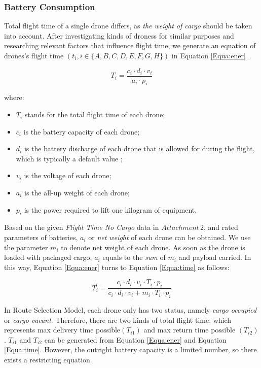 \documentclass{mcmthesis}
\begin{document}
\subsubsection{Battery Consumption}\label{Subsub:batt}

Total flight time of a single drone differs, as \emph{the weight of cargo} should be taken into account. After investigating kinds of droness for similar purposes and researching relevant factors that influence flight time, we generate an equation of drones's flight time $(t_i,i\in\{A,B,C,D,E,F,G,H\})$ in Equation \eqref{Equa:ener}~\cite{DroneFlightTime}.

\begin{equation}\label{Equa:ener}
    T_i = \frac{c_i \cdot d_i \cdot v_i}{a_i \cdot p_i}
\end{equation}

where:
\begin{itemize}
\item $T_i$ stands for the total flight time of each drone;
\item $c_i$ is the battery capacity of each drone;
\item $d_i$ is the battery discharge of each drone that is allowed for during the flight, which is typically a default value ;
\item $v_i$ is the voltage of each drone;
\item $a_i$ is the all-up weight of each drone;
\item $p_i$ is the power required to lift one kilogram of equipment.
\end{itemize}

Based on the given \emph{Flight Time No Cargo} data in $Attachment\,2$, and rated parameters of batteries, $a_i$ or \emph{net weight} of each drone can be obtained. We use the parameter $m_i$ to denote net weight of each drone. As soon as the drone is loaded with packaged cargo, $a_i$ equals to the \emph{sum} of $m_i$ and payload carried. In this way, Equation \ref{Equa:ener} turns to Equation \ref{Equa:time} as follows:

\begin{equation}\label{Equa:time}
    T_i^{'} = \frac{c_i \cdot d_i \cdot v_i \cdot T_i \cdot p_i}{c_i \cdot d_i \cdot v_i + m_i \cdot T_i \cdot p_i}
\end{equation}

In Route Selection Model, each drone only has two status, namely \emph{cargo occupied} or \emph{cargo vacant}. Therefore, there are two kinds of total flight time, which represents max delivery time possible$(T_{i1})$ and max return time possible $(T_{i2})$. $T_{i1}$ and $T_{i2}$ can be generated from Equation \eqref{Equa:ener} and Equation \eqref{Equa:time}. However, the outright battery capacity is a limited number, so there exists a restricting equation.
\end{document}
